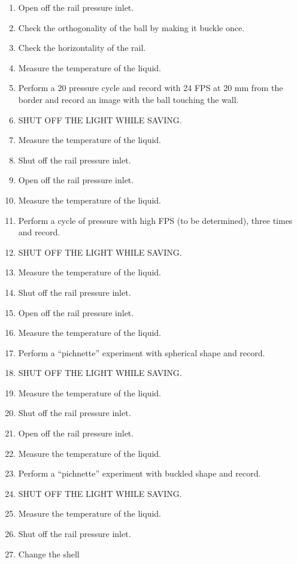 \documentclass[a4paper,twoside,10pt]{report}
\begin{document}
\begin{enumerate}
	\item Open off the rail pressure inlet.
	\item Check the orthogonality of the ball by making it buckle once.
  \item Check the horizontality of the rail.
	
	
	\item Measure the temperature of the liquid.
	\item Perform a 20 pressure cycle and record with 24 FPS at 20 mm from the border and record an image with the ball touching the wall.
	\item SHUT OFF THE LIGHT WHILE SAVING.
	\item Measure the temperature of the liquid.
	\item Shut off the rail pressure inlet.
	
	\item Open off the rail pressure inlet.
	\item Measure the temperature of the liquid.
	\item Perform a cycle of pressure with high FPS (to be determined), three times and record.
	\item SHUT OFF THE LIGHT WHILE SAVING.
	\item Measure the temperature of the liquid.
	\item Shut off the rail pressure inlet.
	
	\item Open off the rail pressure inlet.
	\item Measure the temperature of the liquid.
	\item Perform a ``pichnette'' experiment with spherical shape and record.
	\item SHUT OFF THE LIGHT WHILE SAVING.
	\item Measure the temperature of the liquid.
	\item Shut off the rail pressure inlet.
	
	\item Open off the rail pressure inlet.
	\item Measure the temperature of the liquid.
	\item Perform a ``pichnette'' experiment with buckled shape and record.
	\item SHUT OFF THE LIGHT WHILE SAVING.
	\item Measure the temperature of the liquid.
	\item Shut off the rail pressure inlet.
	
	\item Change the shell
\end{enumerate}
\end{document}
